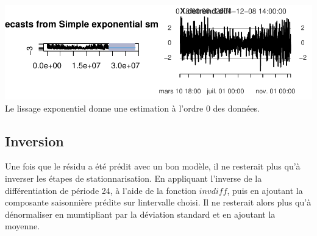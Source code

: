 \documentclass[
]{article}
\begin{document}
\includegraphics{STA202_report_files/figure-latex/SES-1.pdf} Le lissage
exponentiel donne une estimation à l'ordre 0 des données.

\hypertarget{inversion}{%
\subsection{Inversion}\label{inversion}}

Une fois que le résidu a été prédit avec un bon modèle, il ne resterait
plus qu'à inverser les étapes de stationnarisation. En appliquant
l'inverse de la différentiation de période 24, à l'aide de la fonction
\(invdiff\), puis en ajoutant la composante saisonnière prédite sur
lintervalle choisi. Il ne resterait alors plus qu'à dénormaliser en
mumtipliant par la déviation standard et en ajoutant la moyenne.
\end{document}
